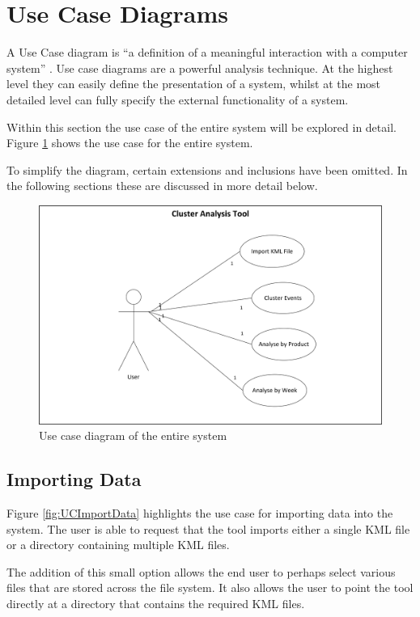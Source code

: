 \section{Use Case Diagrams}

A Use Case diagram is ``a definition of a meaningful interaction with a 
computer system'' \citep{lunn03}. Use case diagrams are a powerful analysis 
technique. At the highest level they can easily define the presentation of a
system, whilst at the most detailed level can fully specify the external 
functionality of a system.

Within this section the use case of the entire system will be explored in 
detail. Figure \ref{fig:use_case} shows the use case for the entire system. 

To simplify the diagram, certain extensions and inclusions have been omitted. 
In the following sections these are discussed in more detail below.

\begin{figure}[H]
  \centering
    \includegraphics[scale=0.8]{chapter7/use_case/use_case.png}
    \caption[Use case diagram of the entire system]
            {Use case diagram of the entire system}
    \label{fig:use_case}
\end{figure}


\subsection{Importing Data}
Figure \ref{fig:UCImportData} highlights the use case for importing data into 
the system. The user is able to request that the tool imports either a single 
KML file or a directory containing multiple KML files.

The addition of this small option allows the end user to perhaps select various 
files that are stored across the file system. It also allows the user to point 
the tool directly at a directory that contains the required KML files.

